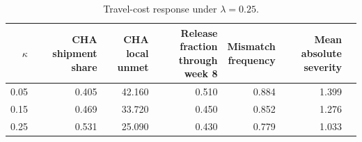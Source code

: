 \begin{table}[!ht]
    \centering \small
    \setlength{\tabcolsep}{4pt}
    \renewcommand{\arraystretch}{1.12}
    \caption{Travel-cost response under $\lambda=0.25$.}
    \label{tab:travel_cost_summary}
    \begin{tabular}{rrrrrrr}
    \toprule
    $\kappa$ & \makecell{CHA shipment\\share} & \makecell{CHA local\\unmet} & \makecell{Release fraction\\through week 8} & \makecell{Mismatch\\frequency} & \makecell{Mean absolute\\severity} \\
    \midrule
    0.05 & 0.405 & 42.160 & 0.510 & 0.884 & 1.399 \\
    0.15 & 0.469 & 33.720 & 0.450 & 0.852 & 1.276 \\
    0.25 & 0.531 & 25.090 & 0.430 & 0.779 & 1.033 \\
    \bottomrule
    \end{tabular}
\end{table}
